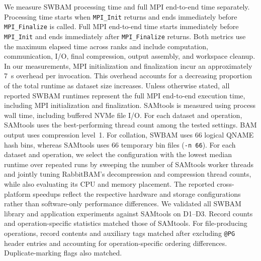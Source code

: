 \documentclass[lettersize,journal]{IEEEtran}
\begin{document}
We measure SWBAM processing time and full MPI end-to-end time separately.
Processing time starts when \texttt{MPI\_Init} returns and ends immediately before \texttt{MPI\_Finalize} is called.
Full MPI end-to-end time starts immediately before \texttt{MPI\_Init} and ends immediately after \texttt{MPI\_Finalize} returns.
Both metrics use the maximum elapsed time across ranks and include computation, communication, I/O, final compression, output assembly, and workspace cleanup.
In our measurements, MPI initialization and finalization incur an approximately 7~s overhead per invocation. 
This overhead accounts for a decreasing proportion of the total runtime as dataset size increases. 
Unless otherwise stated, all reported SWBAM runtimes represent the full MPI end-to-end execution time, including MPI initialization and finalization.
SAMtools is measured using process wall time, including buffered NVMe file I/O.
For each dataset and operation, SAMtools uses the best-performing thread count among the tested settings.
BAM output uses compression level~1.
For collation, SWBAM uses 66 logical QNAME hash bins, whereas SAMtools uses 66 temporary bin files (\texttt{-n 66}).
For each dataset and operation, we select the configuration with the lowest median runtime over repeated runs by sweeping the number of SAMtools worker threads and jointly tuning RabbitBAM's decompression and compression thread counts, while also evaluating its CPU and memory placement.
The reported cross-platform speedups reflect the respective hardware and storage configurations rather than software-only performance differences.
We validated all SWBAM library and application experiments against SAMtools on D1--D3.
Record counts and operation-specific statistics matched those of SAMtools. 
For file-producing operations, record contents and auxiliary tags matched after excluding \texttt{@PG} header entries and accounting for operation-specific ordering differences. Duplicate-marking flags also matched.
\end{document}
